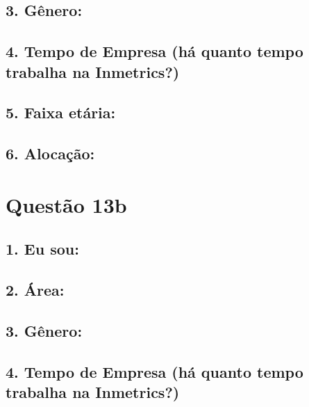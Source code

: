 \documentclass[]{book}
\begin{document}
\hypertarget{genero-17}{%
\subsection{3. Gênero:}\label{genero-17}}

\hypertarget{tempo-de-empresa-ha-quanto-tempo-trabalha-na-inmetrics-17}{%
\subsection{4. Tempo de Empresa (há quanto tempo trabalha na Inmetrics?)}\label{tempo-de-empresa-ha-quanto-tempo-trabalha-na-inmetrics-17}}

\hypertarget{faixa-etaria-17}{%
\subsection{5. Faixa etária:}\label{faixa-etaria-17}}

\hypertarget{alocacao-17}{%
\subsection{6. Alocação:}\label{alocacao-17}}

\hypertarget{questao-13b}{%
\section{Questão 13b}\label{questao-13b}}

\hypertarget{eu-sou-18}{%
\subsection{1. Eu sou:}\label{eu-sou-18}}

\hypertarget{area-18}{%
\subsection{2. Área:}\label{area-18}}

\hypertarget{genero-18}{%
\subsection{3. Gênero:}\label{genero-18}}

\hypertarget{tempo-de-empresa-ha-quanto-tempo-trabalha-na-inmetrics-18}{%
\subsection{4. Tempo de Empresa (há quanto tempo trabalha na Inmetrics?)}\label{tempo-de-empresa-ha-quanto-tempo-trabalha-na-inmetrics-18}}
\end{document}
